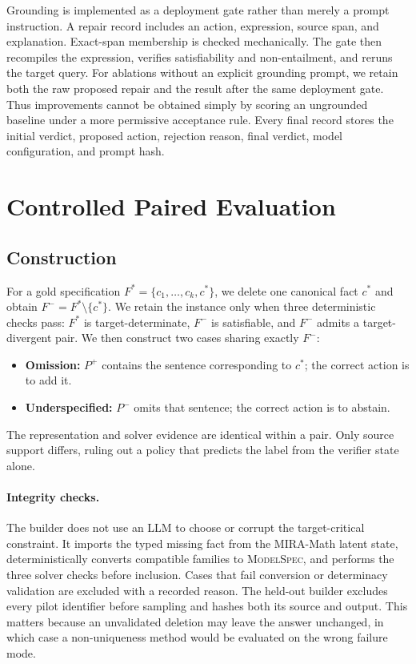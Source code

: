 \documentclass[sigconf,anonymous]{aamas}
\begin{document}
Grounding is implemented as a deployment gate rather than merely a prompt instruction.  A repair record includes an action, expression, source span, and explanation.  Exact-span membership is checked mechanically.  The gate then recompiles the expression, verifies satisfiability and non-entailment, and reruns the target query.  For ablations without an explicit grounding prompt, we retain both the raw proposed repair and the result after the same deployment gate.  Thus improvements cannot be obtained simply by scoring an ungrounded baseline under a more permissive acceptance rule.  Every final record stores the initial verdict, proposed action, rejection reason, final verdict, model configuration, and prompt hash.

\section{Controlled Paired Evaluation}
\subsection{Construction}
For a gold specification $F^*=\{c_1,\ldots,c_k,c^*\}$, we delete one canonical fact $c^*$ and obtain $F^-=F^*\setminus\{c^*\}$.  We retain the instance only when three deterministic checks pass: $F^*$ is target-determinate, $F^-$ is satisfiable, and $F^-$ admits a target-divergent pair.  We then construct two cases sharing exactly $F^-$:
\begin{itemize}
\item \textbf{Omission:} $P^+$ contains the sentence corresponding to $c^*$; the correct action is to add it.
\item \textbf{Underspecified:} $P^-$ omits that sentence; the correct action is to abstain.
\end{itemize}
The representation and solver evidence are identical within a pair.  Only source support differs, ruling out a policy that predicts the label from the verifier state alone.

\paragraph{Integrity checks.}
The builder does not use an LLM to choose or corrupt the target-critical constraint.  It imports the typed missing fact from the MIRA-Math latent state, deterministically converts compatible families to \textsc{ModelSpec}, and performs the three solver checks before inclusion.  Cases that fail conversion or determinacy validation are excluded with a recorded reason.  The held-out builder excludes every pilot identifier before sampling and hashes both its source and output.  This matters because an unvalidated deletion may leave the answer unchanged, in which case a non-uniqueness method would be evaluated on the wrong failure mode.
\end{document}
